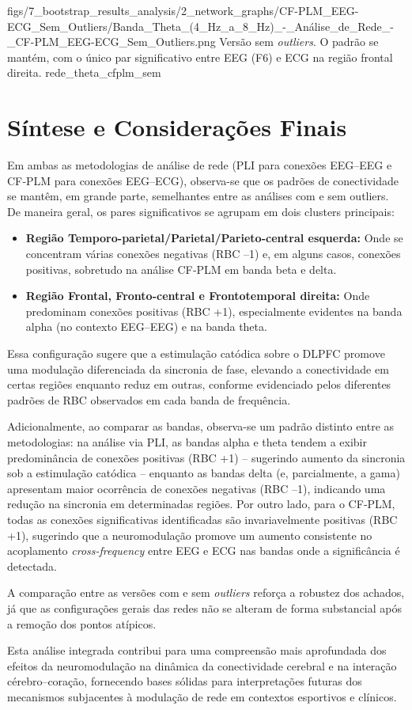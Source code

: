\smallfigure
{figs/7_bootstrap_results_analysis/2_network_graphs/CF-PLM_EEG-ECG_Sem_Outliers/Banda_Theta_(4_Hz_a_8_Hz)_-_Análise_de_Rede_-_CF-PLM_EEG-ECG_Sem_Outliers.png}
{Versão sem \textit{outliers}. O padrão se mantém, com o único par significativo entre EEG (F6) e ECG na região frontal direita.}
{rede_theta_cfplm_sem}


\section{Síntese e Considerações Finais}
Em ambas as metodologias de análise de rede (PLI para conexões EEG–EEG e CF‐PLM para conexões EEG–ECG), observa-se que os padrões de conectividade se mantêm, em grande parte, semelhantes entre as análises com e sem outliers. De maneira geral, os pares significativos se agrupam em dois clusters principais: 
\begin{itemize}
    \item \textbf{Região Temporo-parietal/Parietal/Parieto-central esquerda:} Onde se concentram várias conexões negativas (RBC –1) e, em alguns casos, conexões positivas, sobretudo na análise CF‐PLM em banda beta e delta.
    \item \textbf{Região Frontal, Fronto-central e Frontotemporal direita:} Onde predominam conexões positivas (RBC +1), especialmente evidentes na banda alpha (no contexto EEG–EEG) e na banda theta.
\end{itemize}

Essa configuração sugere que a estimulação catódica sobre o DLPFC promove uma modulação diferenciada da sincronia de fase, elevando a conectividade em certas regiões enquanto reduz em outras, conforme evidenciado pelos diferentes padrões de RBC observados em cada banda de frequência.

Adicionalmente, ao comparar as bandas, observa-se um padrão distinto entre as metodologias: na análise via PLI, as bandas alpha e theta tendem a exibir predominância de conexões positivas (RBC +1) – sugerindo aumento da sincronia sob a estimulação catódica – enquanto as bandas delta (e, parcialmente, a gama) apresentam maior ocorrência de conexões negativas (RBC –1), indicando uma redução na sincronia em determinadas regiões. Por outro lado, para o CF‐PLM, todas as conexões significativas identificadas são invariavelmente positivas (RBC +1), sugerindo que a neuromodulação promove um aumento consistente no acoplamento \textit{cross-frequency} entre EEG e ECG nas bandas onde a significância é detectada.

A comparação entre as versões com e sem \textit{outliers} reforça a robustez dos achados, já que as configurações gerais das redes não se alteram de forma substancial após a remoção dos pontos atípicos.

Esta análise integrada contribui para uma compreensão mais aprofundada dos efeitos da neuromodulação na dinâmica da conectividade cerebral e na interação cérebro–coração, fornecendo bases sólidas para interpretações futuras dos mecanismos subjacentes à modulação de rede em contextos esportivos e clínicos.